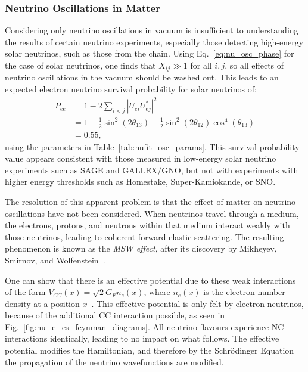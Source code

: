 \subsubsection{Neutrino Oscillations in Matter}
Considering only neutrino oscillations in vacuum is insufficient to understanding the results of certain neutrino experiments, especially those detecting high-energy solar neutrinos, such as those from the \beight{} chain. Using Eq.~\ref{eq:nu_osc_phase} for the case of solar neutrinos, one finds that $X_{ij}\gg 1$ for all $i,j$, so all effects of neutrino oscillations in the vacuum should be washed out. This leads to an expected electron neutrino survival probability for solar neutrinos of:
\begin{align}\label{eq:solar_pee_naive}
    P_{ee}  &= 1 - 2\sum_{i<j}|U_{ei}U_{ej}^{*}|^{2}\\
            &= 1 - \frac{1}{2}\sin^{2}(2\theta_{13}) - \frac{1}{2}\sin^{2}(2\theta_{12})\cos^{4}(\theta_{13})\\
            &= 0.55,
\end{align}
using the parameters in Table~\ref{tab:nufit_osc_params}. This survival probability value appears consistent with those measured in low-energy solar neutrino experiments such as SAGE and GALLEX/GNO, but not with experiments with higher energy thresholds such as Homestake, Super-Kamiokande, or SNO.

The resolution of this apparent problem is that the effect of matter on neutrino oscillations have not been considered. When neutrinos travel through a medium, the electrons, protons, and neutrons within that medium interact weakly with those neutrinos, leading to coherent forward elastic scattering. The resulting phenomenon is known as the \textit{MSW effect}, after its discovery by Mikheyev, Smirnov, and Wolfenstein~\cite{}. %

One can show that there is an effective potential due to these weak interactions of the form $V_{CC}(x) = \sqrt{2}G_{F}n_{e}(x)$, where $n_{e}(x)$ is the electron number density at a position $x$~\cite{}. %
This effective potential is only felt by electron neutrinos, because of the additional CC interaction possible, as seen in Fig.~\ref{fig:nu_e_es_feynman_diagrams}. All neutrino flavours experience NC interactions identically, leading to no impact on what follows. The effective potential modifies the Hamiltonian, and therefore by the Schr\"{o}dinger Equation the propagation of the neutrino wavefunctions are modified.

